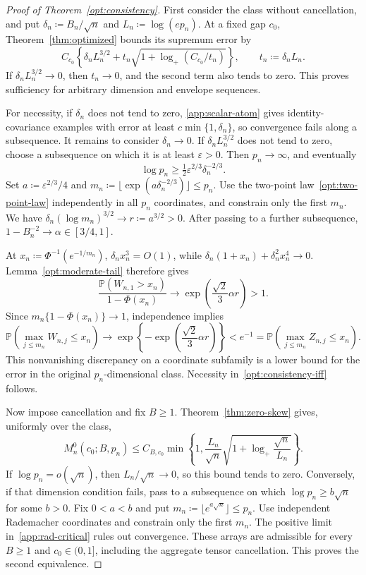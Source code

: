\documentclass[11pt,letterpaper]{article}
\theoremstyle{remark}
\newcommand{\Pp}{\mathbb P}
\begin{document}
\begin{proof}[Proof of Theorem~\ref{opt:consistency}]
First consider the class without cancellation, and put
\(\delta_n\coloneqq B_n/\sqrt n\) and
\(L_n\coloneqq\log(ep_n)\). At a fixed gap \(c_0\),
Theorem~\ref{thm:optimized} bounds its supremum error by
\[
 C_{c_0}\left\{\delta_nL_n^{3/2}
  +t_n\sqrt{1+\log_+(C_{c_0}/t_n)}\right\},
 \qquad t_n\coloneqq\delta_nL_n.
\]
If \(\delta_nL_n^{3/2}\to0\), then \(t_n\to0\), and the second
term also tends to zero. This proves sufficiency for arbitrary
dimension and envelope sequences.

For necessity, if \(\delta_n\) does not tend to zero,
\eqref{app:scalar-atom} gives identity-covariance examples with error
at least \(c\min\{1,\delta_n\}\), so convergence fails along a
subsequence. It remains to consider \(\delta_n\to0\).
If \(\delta_nL_n^{3/2}\) does not tend to zero, choose a subsequence
on which it is at least \(\varepsilon>0\). Then \(p_n\to\infty\), and
eventually
\[
 \log p_n\ge\tfrac12\varepsilon^{2/3}\delta_n^{-2/3}.
\]
Set \(a\coloneqq\varepsilon^{2/3}/4\) and
\(m_n\coloneqq\lfloor\exp(a\delta_n^{-2/3})\rfloor\le p_n\).
Use the two-point law~\eqref{opt:two-point-law} independently in all
\(p_n\) coordinates, and constrain only the first \(m_n\).
We have
\(\delta_n(\log m_n)^{3/2}\to r\coloneqq a^{3/2}>0\).
After passing to a further subsequence,
\(1-B_n^{-2}\to\alpha\in[3/4,1]\).

At \(x_n\coloneqq\Phi^{-1}(e^{-1/m_n})\),
\(\delta_nx_n^3=O(1)\), while
\(\delta_n(1+x_n)+\delta_n^2x_n^4\to0\).
Lemma~\ref{opt:moderate-tail} therefore gives
\[
 \frac{\Pp(W_{n,1}>x_n)}{1-\Phi(x_n)}
 \longrightarrow \exp\!\left(\frac{\sqrt2}{3}\alpha r\right)>1.
\]
Since \(m_n\{1-\Phi(x_n)\}\to1\), independence implies
\[
 \Pp(\max_{j\le m_n}W_{n,j}\le x_n)
 \longrightarrow
 \exp\!\left\{-\exp\!\left(\frac{\sqrt2}{3}\alpha r\right)\right\}
 <e^{-1}
 =\Pp(\max_{j\le m_n}Z_{n,j}\le x_n).
\]
This nonvanishing discrepancy on a coordinate subfamily is a lower
bound for the error in the original \(p_n\)-dimensional class.
Necessity in~\eqref{opt:consistency-iff} follows.

Now impose cancellation and fix \(B\ge1\). Theorem~\ref{thm:zero-skew}
gives, uniformly over the class,
\[
 M_n^0(c_0;B,p_n)\le C_{B,c_0}\min\!\left\{1,
 \frac{L_n}{\sqrt n}
       \sqrt{1+\log_+\frac{\sqrt n}{L_n}}\right\}.
\]
If \(\log p_n=o(\sqrt n)\), then \(L_n/\sqrt n\to0\), so this
bound tends to zero. Conversely, if that dimension condition fails,
pass to a subsequence on which \(\log p_n\ge b\sqrt n\) for some
\(b>0\). Fix \(0<a<b\) and put
\(m_n\coloneqq\lfloor e^{a\sqrt n}\rfloor\le p_n\).
Use independent Rademacher coordinates and constrain only the first
\(m_n\). The positive limit in~\eqref{app:rad-critical} rules out
convergence. These arrays are admissible for every \(B\ge1\) and
\(c_0\in(0,1]\), including the aggregate tensor cancellation.
This proves the second equivalence.
\end{proof}
\end{document}
